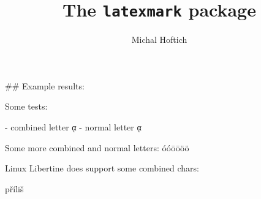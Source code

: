 \documentclass{article}
\begin{document}
\title{The \texttt{latexmark} package}
\author{Michal Hoftich}
\maketitle

\begin{latexmark}

## Example results:


 Some tests:

- combined letter ᾳ %
- normal letter ᾳ%

Some more combined and normal letters: 
óóōōöö

Linux Libertine does support some combined chars: \parbox{4em}{příliš}
\end{latexmark}
\end{document}
